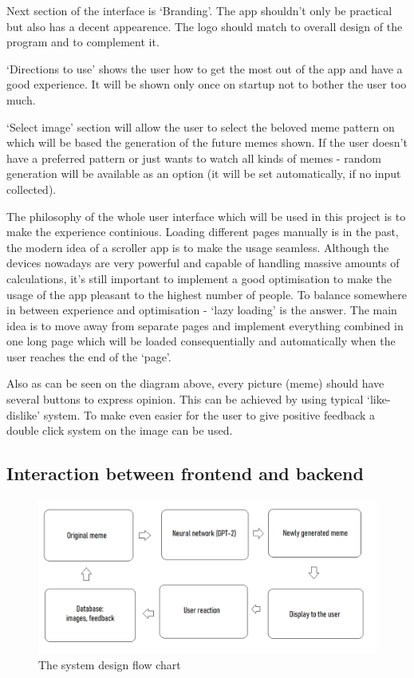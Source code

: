 \documentclass[12pt]{report}
\begin{document}
    Next section of the interface is `Branding'. The app shouldn't only be practical but also has a decent appearence. The logo should match to overall design of the program and to complement it.

    `Directions to use' shows the user how to get the most out of the app and have a good experience. It will be shown only once on startup not to bother the user too much.

    `Select image' section will allow the user to select the beloved meme pattern on which will be based the generation of the future memes shown. If the user doesn't have a preferred pattern or just wants to watch all kinds of memes - random generation will be available as an option (it will be set automatically, if no input collected).

    The philosophy of the whole user interface which will be used in this project is to make the experience continious. Loading different pages manually is in the past, the modern idea of a scroller app is to make the usage seamless. Although the devices nowadays are very powerful and capable of handling massive amounts of calculations, it's still
    important to implement a good optimisation to make the usage of the app pleasant to the highest number of people. To balance somewhere in between experience and optimisation - `lazy loading' is the answer. The main idea is to move away from separate pages and implement everything combined in one long page which will be loaded consequentially and automatically when the user reaches the end of the `page'.

    Also as can be seen on the diagram above, every picture (meme) should have several buttons to express opinion. This can be achieved by using typical `like-dislike' system. To make even easier for the user to give positive feedback a double click system on the image can be used.
    
    \clearpage

    \subsection*{Interaction between frontend and backend}

    \begin{figure}[htbp]
        \centerline{\includegraphics[scale=.5]{img/flow_diagram.png}}
        \label{flow_diagram}
        \caption{The system design flow chart}
    \end{figure}
\end{document}
